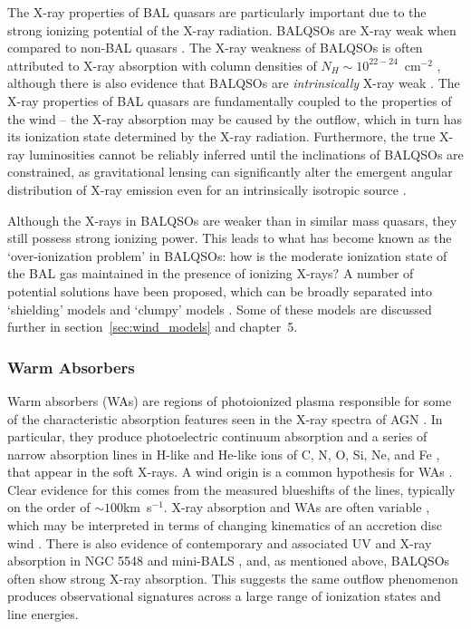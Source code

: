 The X-ray properties of BAL quasars are particularly important due
to the strong ionizing potential of the X-ray radiation. 
BALQSOs are X-ray weak when compared to 
non-BAL quasars \citep{gibson2009}. 
The X-ray weakness of BALQSOs is often attributed to X-ray absorption 
with column densities of $N_H \sim 10^{22-24}$~cm$^{-2}$ 
\citep{gallagher1999,gallagher2002,green2001,grupe2003,stalin2011},
although there is also evidence that BALQSOs are {\em intrinsically}
X-ray weak \citep{sabra2001,clavel2006,morabito2013}.
The X-ray properties of BAL quasars are fundamentally coupled to 
the properties of the wind -- the X-ray absorption may be caused by 
the outflow, which in turn has its ionization state 
determined by the X-ray radiation. Furthermore, the true X-ray 
luminosities cannot be reliably inferred until the 
inclinations of BALQSOs are
constrained, as gravitational lensing can significantly alter the
emergent angular distribution of X-ray emission even for an intrinsically
isotropic source \citep{chen2013a, chen2013b}.

Although the X-rays in BALQSOs are weaker than in similar mass quasars,
they still possess strong ionizing power. This leads to what has become
known as the `over-ionization problem' in BALQSOs: how is the moderate 
ionization state of the BAL gas maintained in the presence of ionizing 
X-rays? A number of potential solutions have been proposed, which can be 
broadly separated into `shielding' models \citep{MCGV95,PK04} and `clumpy'
models \citep{dekool1995,hamann2013}. Some of these models are discussed
further in section~\ref{sec:wind_models} and chapter~5.

\subsubsection{Warm Absorbers}

Warm absorbers (WAs) are regions of photoionized plasma responsible for some
of the characteristic absorption features seen in the 
X-ray spectra of AGN \citep{reynolds1995}.
In particular, they produce photoelectric continuum absorption 
\citep[e.g.][]{halpern1984,cappi1996,kriss1996}
and a series of narrow absorption lines in H-like and He-like ions of 
C, N, O, Si, Ne, and Fe \citep{kaastra2000}, that appear in the soft X-rays.
A wind origin is a common hypothesis for WAs 
\citep[e.g.][]{krolikkriss2001}. Clear evidence for this 
comes from the measured blueshifts of the lines, typically on the order of 
$\sim100$km~s$^{-1}$. X-ray absorption and WAs are often
variable \citep{fabian1994,otani1996}, which may be interpreted in terms of 
changing kinematics of an accretion disc wind \citep{connolly2014}. 
There is also evidence of contemporary and associated UV and X-ray absorption 
in NGC 5548 \citep{kaastra2014} and mini-BALS \citep{giustini2011},
and, as mentioned above, BALQSOs often show strong X-ray absorption. 
This suggests the same outflow phenomenon produces observational signatures  
across a large range of ionization states and line energies. 

